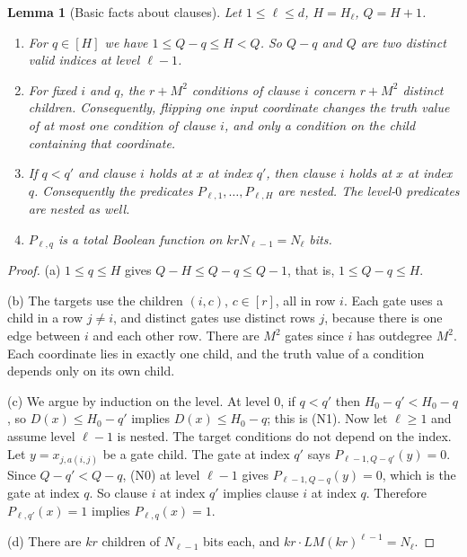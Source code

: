 \documentclass[11pt]{article}
\newtheorem{lemma}[theorem]{Lemma}
\theoremstyle{definition}
\theoremstyle{remark}
\begin{document}
\begin{lemma}[Basic facts about clauses]\label{lem:clauses}
Let \(1\le\ell\le d\), \(H=H_\ell\), \(Q=H+1\).
\begin{enumerate}[label=\textup{(\alph*)},leftmargin=*]
\item For \(q\in[H]\) we have \(1\le Q-q\le H<Q\). So \(Q-q\) and \(Q\) are two distinct valid indices at level \(\ell-1\).
\item For fixed \(i\) and \(q\), the \(r+M^2\) conditions of clause \(i\) concern \(r+M^2\) distinct children. Consequently, flipping one input coordinate changes the truth value of at most one condition of clause \(i\), and only a condition on the child containing that coordinate.
\item If \(q<q'\) and clause \(i\) holds at \(x\) at index \(q'\), then clause \(i\) holds at \(x\) at index \(q\). Consequently the predicates \(P_{\ell,1},\ldots,P_{\ell,H}\) are nested. The level-\(0\) predicates are nested as well.
\item \(P_{\ell,q}\) is a total Boolean function on \(krN_{\ell-1}=N_\ell\) bits.
\end{enumerate}
\end{lemma}
\begin{proof}
(a) \(1\le q\le H\) gives \(Q-H\le Q-q\le Q-1\), that is, \(1\le Q-q\le H\).

(b) The targets use the children \((i,c)\), \(c\in[r]\), all in row \(i\). Each gate uses a child in a row \(j\ne i\), and distinct gates use distinct rows \(j\), because there is one edge between \(i\) and each other row. There are \(M^2\) gates since \(i\) has outdegree \(M^2\). Each coordinate lies in exactly one child, and the truth value of a condition depends only on its own child.

(c) We argue by induction on the level. At level \(0\), if \(q<q'\) then \(H_0-q'<H_0-q\), so \(D(x)\le H_0-q'\) implies \(D(x)\le H_0-q\); this is (N1). Now let \(\ell\ge1\) and assume level \(\ell-1\) is nested. The target conditions do not depend on the index. Let \(y=x_{j,a(i,j)}\) be a gate child. The gate at index \(q'\) says \(P_{\ell-1,Q-q'}(y)=0\). Since \(Q-q'<Q-q\), (N0) at level \(\ell-1\) gives \(P_{\ell-1,Q-q}(y)=0\), which is the gate at index \(q\). So clause \(i\) at index \(q'\) implies clause \(i\) at index \(q\). Therefore \(P_{\ell,q'}(x)=1\) implies \(P_{\ell,q}(x)=1\).

(d) There are \(kr\) children of \(N_{\ell-1}\) bits each, and \(kr\cdot LM(kr)^{\ell-1}=N_\ell\).
\end{proof}
\end{document}
